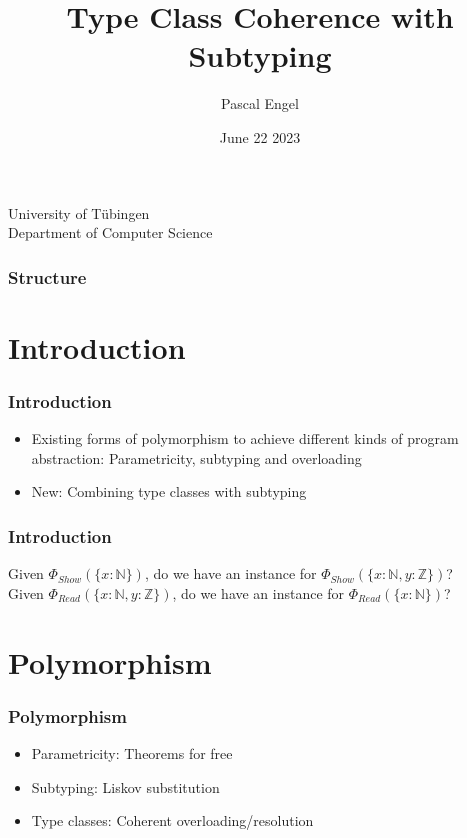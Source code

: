 \documentclass{beamer}
\title{Type Class Coherence with Subtyping}
\author{Pascal Engel}
\date{June 22 2023}
\newcommand\Nat{\mathbb{N}}
\newcommand\Int{\mathbb{Z}}
\begin{document}
\begin{frame}
  \centering
  University of T\"ubingen\\
  Department of Computer Science\\
  \maketitle
\end{frame}

\begin{frame}
  \frametitle{Structure}
  \tableofcontents
\end{frame}

\section{Introduction}

\begin{frame}
  \frametitle{Introduction}

  \begin{itemize}
    \item Existing forms of polymorphism to achieve different kinds of program abstraction: Parametricity, subtyping and overloading
    \item New: Combining type classes with subtyping
  \end{itemize}
\end{frame}

\begin{frame}
  \frametitle{Introduction}

  Given $\Phi_{\mathit{Show}}(\{ x : \Nat \})$, do we have an instance for $\Phi_{\mathit{Show}}(\{ x : \Nat, y : \Int \})$?
  \\

  \pause
  Given $\Phi_{\mathit{Read}}(\{ x : \Nat, y : \Int \})$, do we have an instance for  $\Phi_{\mathit{Read}}(\{ x : \Nat \})$?
\end{frame}

\section{Polymorphism}

\begin{frame}
  \frametitle{Polymorphism}

  \begin{itemize}
    \item Parametricity: Theorems for free \cite{wadlertheorems}
    \item Subtyping: Liskov substitution \cite{liskov}
    \item Type classes: Coherent overloading/resolution \cite{reynolds_coherence}
  \end{itemize}
\end{frame}
\end{document}
